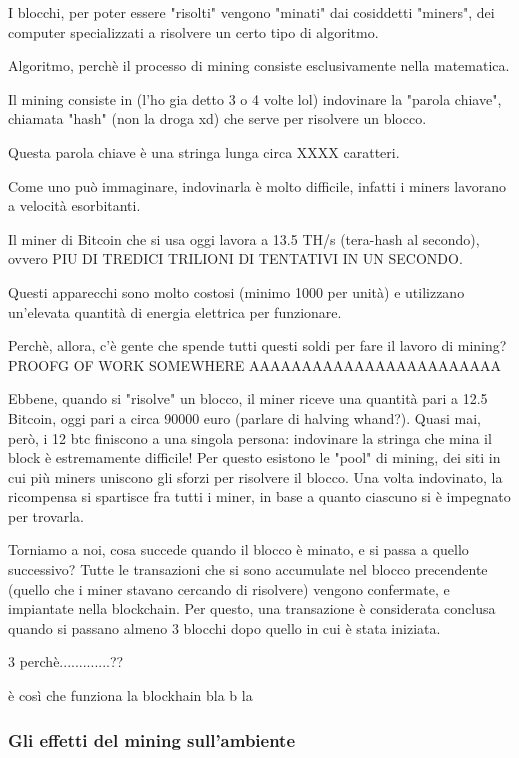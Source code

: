 \documentclass {article}
\begin{document}
I blocchi, per poter essere "risolti" vengono "minati" dai cosiddetti "miners", dei computer specializzati a risolvere un certo tipo di algoritmo.

Algoritmo, perchè il processo di mining consiste esclusivamente nella matematica.

Il mining consiste in (l'ho gia detto 3 o 4 volte lol) indovinare la "parola chiave", chiamata "hash" (non la droga xd) che serve per risolvere un blocco.

Questa parola chiave è una stringa lunga circa XXXX caratteri.

Come uno può immaginare, indovinarla è molto difficile, infatti i miners lavorano a velocità esorbitanti.

Il miner di Bitcoin che si usa oggi lavora a 13.5 TH/s (tera-hash al secondo), ovvero PIU DI TREDICI TRILIONI DI TENTATIVI IN UN SECONDO.

Questi apparecchi sono molto costosi (minimo 1000 per unità) e utilizzano un'elevata quantità di energia elettrica per funzionare.

Perchè, allora, c'è gente che spende tutti questi soldi per fare il lavoro di mining? PROOFG  OF WORK SOMEWHERE AAAAAAAAAAAAAAAAAAAAAAAA

Ebbene, quando si "risolve" un blocco, il miner riceve una quantità pari a 12.5 Bitcoin, oggi pari a circa 90000 euro (parlare di halving whand?). Quasi mai, però, i 12 btc finiscono a una singola persona: indovinare la stringa che mina il block è estremamente difficile! Per questo esistono le "pool" di mining, dei siti in cui più miners uniscono gli sforzi per risolvere il blocco. Una volta indovinato, la ricompensa si spartisce fra tutti i miner, in base a quanto ciascuno si è impegnato per trovarla.

Torniamo a noi, cosa succede quando il blocco è minato, e si passa a quello successivo? Tutte le transazioni che si sono accumulate nel blocco precendente (quello che i miner stavano cercando di risolvere) vengono confermate, e impiantate nella blockchain. Per questo, una transazione è considerata conclusa quando si passano almeno 3 blocchi dopo quello in cui è stata iniziata.

3 perchè.............??

è così che funziona la blockhain bla b la



\subsubsection {Gli effetti del mining sull'ambiente}
\end{document}
